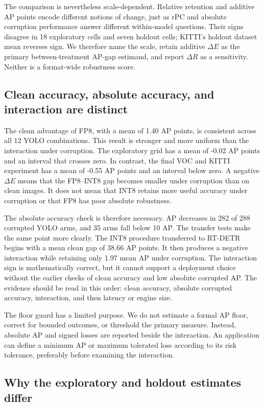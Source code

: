 \documentclass[a4paper,fleqn]{cas-dc}
\begin{document}
The comparison is nevertheless scale-dependent. Relative retention and additive AP points encode different notions of change, just as rPC and absolute corruption performance answer different within-model questions. Their signs disagree in 18 exploratory cells and seven holdout cells; KITTI's holdout dataset mean reverses sign. We therefore name the scale, retain additive $\Delta E$ as the primary between-treatment AP-gap estimand, and report $\Delta R$ as a sensitivity. Neither is a format-wide robustness score.

\subsection{Clean accuracy, absolute accuracy, and interaction are distinct}

The clean advantage of FP8, with a mean of 1.40 AP points, is consistent across all 12 YOLO combinations. This result is stronger and more uniform than the interaction under corruption. The exploratory grid has a mean of -0.02 AP points and an interval that crosses zero. In contrast, the final VOC and KITTI experiment has a mean of -0.55 AP points and an interval below zero. A negative $\Delta E$ means that the FP8--INT8 gap becomes smaller under corruption than on clean images. It does not mean that INT8 retains more useful accuracy under corruption or that FP8 has poor absolute robustness.

The absolute accuracy check is therefore necessary. AP decreases in 282 of 288 corrupted YOLO arms, and 35 arms fall below 10 AP. The transfer tests make the same point more clearly. The INT8 procedure transferred to RT-DETR begins with a mean clean gap of 38.66 AP points. It then produces a negative interaction while retaining only 1.97 mean AP under corruption. The interaction sign is mathematically correct, but it cannot support a deployment choice without the earlier checks of clean accuracy and low absolute corrupted AP. The evidence should be read in this order: clean accuracy, absolute corrupted accuracy, interaction, and then latency or engine size.

The floor guard has a limited purpose. We do not estimate a formal AP floor, correct for bounded outcomes, or threshold the primary measure. Instead, absolute AP and signed losses are reported beside the interaction. An application can define a minimum AP or maximum tolerated loss according to its risk tolerance, preferably before examining the interaction.

\subsection{Why the exploratory and holdout estimates differ}
\end{document}
